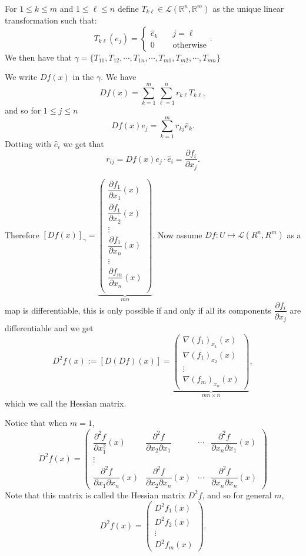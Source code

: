 \documentclass[11pt,openany]{book}
\theoremstyle{plain}
\theoremstyle{definition}
\theoremstyle{remark}
\newcommand{\dell}[2]{\dfrac{\partial #1}{\partial #2}}
\begin{document}
For $1\leq k\leq m$ and $1\leq \ell \leq 
n$ define $T_{k\ell}\in \mathcal 
L(\mathbb R^n,\mathbb R^m)$ as the 
unique linear transformation such that:
$$T_{k\ell}(e_j)=\begin{cases}\hat{e}_k \quad & j=\ell\\ 0 &\text{otherwise}\end{cases}.$$
We then have that $\gamma=\{T_{11}, T_{12},\cdots, T_{1n},\cdots, T_{m1},T_{m2},\cdots, T_{mn}\}$

We write $Df(x)$ in the $\gamma$. We have
$$Df(x)=\sum_{k=1}^m\sum_{\ell=1}^n r_{k\ell}T_{k\ell},$$
and so for $1\leq j\leq n$
$$Df(x)e_j=\sum_{k=1}^m r_{kj}\hat{e}_k.$$
Dotting with $\hat e_i$ we get that
$$r_{ij}=Df(x)e_j\cdot \hat{e}_i=\dfrac{\partial f_i}{\partial x_j}.$$

Therefore $[Df(x)]_\gamma = \underbrace{\begin{pmatrix}
        \dell{f_1}{x_1}(x)\\
        \dell{f_1}{x_2}(x)\\
        \vdots\\
        \dell{f_1}{x_n}(x)\\
        \vdots\\
        \dell{f_m}{x_n}(x)\\
    \end{pmatrix}}_{mn}$.
Now assume $Df:U\mapsto \mathcal L(R^n,R^m)$
as a map is differentiable, this is only possible if and only if all its components $\dfrac{\partial f_i}{\partial x_j}$ are differentiable and we get
\[
    D^2f(x):=[D(Df)(x)] = \underbrace{\begin{pmatrix}
        \nabla (f_1)_{x_1}(x)\\
        \nabla (f_1)_{x_2}(x) \\
        \vdots \\
        \nabla (f_m)_{x_n}(x)
    \end{pmatrix}}_{mn \times n},\]
which we call the Hessian matrix.

Notice that when $m=1$,
$$D^2f(x)=\begin{pmatrix} \dfrac{\partial^2f}{\partial x_1^2}(x) & \dfrac{\partial^2 f}{\partial x_2\partial x_1}&\cdots& \dfrac{\partial^2 f}{\partial x_n\partial x_1}(x)\\
\vdots
\\
\dfrac{\partial^2f}{\partial x_1\partial x_n}(x) & \dfrac{\partial^2 f}{\partial x_2\partial x_n}(x)&\cdots& \dfrac{\partial^2 f}{\partial x_n\partial x_n}(x)\end{pmatrix}
$$
Note that this matrix is called the Hessian matrix $D^2f$, and so for general $m$,
$$D^2f(x)=\begin{pmatrix} D^2f_1(x)\\
D^2f_2(x)\\
\vdots\\
D^2f_m(x)\end{pmatrix}.$$
\end{document}
